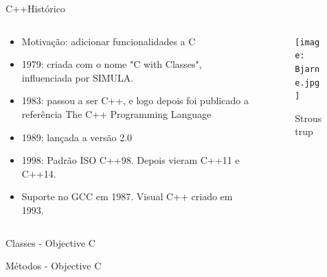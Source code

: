 \documentclass[compress]{beamer}
\begin{document}
\begin{frame}{C++}{Histórico}
    \begin{columns}[T] %
    \begin{column}[T]{.8\textwidth} %
        \begin{minipage}[c][.7\textheight][c]{\linewidth}
            \begin{itemize}
                \item {   
                    Motivação: adicionar funcionalidades a C
                }
                \item {   
                    1979: criada com o nome "C with Classes", influenciada por SIMULA.
                }
                \item {
                    1983: passou a ser C++, e logo depois foi publicado a referência The C++ Programming Language
                }
                \item {
                    1989: lançada a versão 2.0
                }
                \item {
                    1998: Padrão ISO C++98. Depois vieram C++11 e C++14.
                }
                \item {
                    Suporte no GCC em 1987. Visual C++ criado em 1993.
                }
            \end{itemize}
        \end{minipage}
    \end{column}
    \begin{column}[T]{.2\textwidth} %
        \begin{figure}
        \centering
        \texttt{[image: Bjarne.jpg]}
        \caption{Stroustrup}
        \end{figure}
    \end{column}
    \end{columns}
\end{frame}

\begin{frame}{Classes - Objective C}
    \begingroup
        \ttfamily
        
    \endgroup
\end{frame}

\begin{frame}{Métodos - Objective C}
    \begingroup
        \ttfamily
        
    \endgroup
\end{frame}
\end{document}
